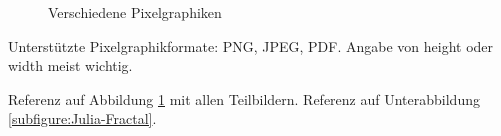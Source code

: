 \begin{figure}[h]
	\centering
	\qquad
	\caption[
		Verschiedene Pixelgraphiken\newline
		\small\texttt{https://mediacube.at/wiki/}
	]{
		Verschiedene Pixelgraphiken
	}
	\label{figure:PixelImages}
\end{figure}

Unterstützte Pixelgraphikformate: PNG, JPEG, PDF.
Angabe von height oder width meist wichtig.

Referenz auf Abbildung \ref{figure:PixelImages} mit allen Teilbildern.
Referenz auf Unterabbildung \ref{subfigure:Julia-Fractal}.


